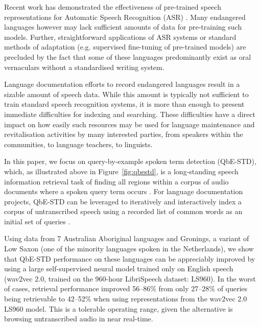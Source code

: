 \documentclass{article}
\begin{document}
Recent work has demonstrated the effectiveness of pre-trained speech representations for Automatic Speech Recognition (ASR) \cite{schneiderWav2vecUnsupervisedPretraining2019,baevski2019vq,baevskiWav2vecFrameworkSelfsupervisedtoappear,conneau2020unsupervised}.
Many endangered languages however may lack sufficient amounts of data for pre-training such models.
Further, straightforward applications of ASR systems or standard methods of adaptation (e.g. supervised fine-tuning of pre-trained models) are precluded by the fact that some of these languages predominantly exist as oral vernaculars without a standardised writing system. 

Language documentation efforts to record endangered languages result in a sizable amount of speech data.
While this amount is typically not sufficient to train standard speech recognition systems, it is more than enough to present immediate difficulties for indexing and searching.
These difficulties have a direct impact on how easily such resources may be used for language maintenance and revitalisation activities by many interested parties, from speakers within the communities, to language teachers, to linguists.

In this paper, we focus on query-by-example spoken term detection (QbE-STD), which, as illustrated above in Figure~\ref{fig:qbestd}, is a long-standing speech information retrieval task of finding all regions within a corpus of audio documents where a spoken query term occurs \cite{myersInvestigationUseDynamic1980,rohlicek1995Word,fiscusResults2006Spoken2007,rodriguez-fuentesHighperformanceQuerybyexampleSpoken2014}.
For language documentation projects, QbE-STD can be leveraged to iteratively and interactively index a corpus of untranscribed speech using a recorded list of common words as an initial set of queries \cite{birdSparseTranscriptiontoappear,leferrandEnablingInteractiveTranscription2020}.

Using data from 7 Australian Aboriginal languages and Gronings, a variant of Low Saxon (one of the minority languages spoken in the Netherlands), we show that QbE-STD performance on these languages can be appreciably improved by using a large self-supervised neural model trained only on English speech (wav2vec 2.0, trained on the 960-hour LibriSpeech dataset: LS960).
In the worst of cases, retrieval performance improved 56--86\% from only 27--28\% of queries being retrievable to 42--52\% when using representations from the wav2vec 2.0 LS960 model.
This is a tolerable operating range, given the alternative is browsing untranscribed audio in near real-time.
\end{document}
